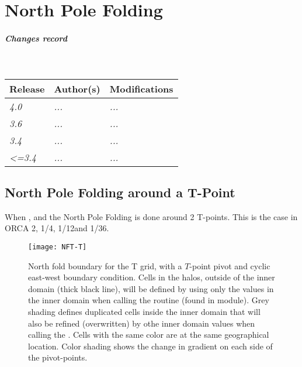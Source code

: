 \documentclass[../main/NEMO_manual]{subfiles}
\begin{document}
\chapter{North Pole Folding}
\label{apdx:NFOLD}

\chaptertoc

\paragraph{Changes record} ~\\

{\footnotesize
  \begin{tabularx}{\textwidth}{l||X|X}
    Release & Author(s) & Modifications \\
    \hline
    {\em   4.0} & {\em ...} & {\em ...} \\
    {\em   3.6} & {\em ...} & {\em ...} \\
    {\em   3.4} & {\em ...} & {\em ...} \\
    {\em <=3.4} & {\em ...} & {\em ...}
  \end{tabularx}
}

\clearpage

\section[North Pole Folding around a T-Point]{North Pole Folding around a T-Point}

When ,  and  the North Pole Folding is done around 2 T-points. This is the case in ORCA 2\deg, 1/4\deg, 1/12\deg and 1/36\deg.

\begin{figure}[h]
  \centering
  \texttt{[image: NFT-T]}
  \caption{
    North fold boundary for the T grid, with a $T$-point pivot and cyclic east-west boundary condition.
    Cells in the halos, outside of the inner domain (thick black line), will be defined by using only the values in the inner domain when calling the  routine (found in  module). Grey shading defines duplicated cells inside the inner domain that will also be refined (overwritten) by othe inner domain values when calling the .
    Cells with the same color are at the same geographical location. Color shading shows the change in gradient on each side of the pivot-points.}
  \label{fig:NFT-T}
\end{figure}
\end{document}
